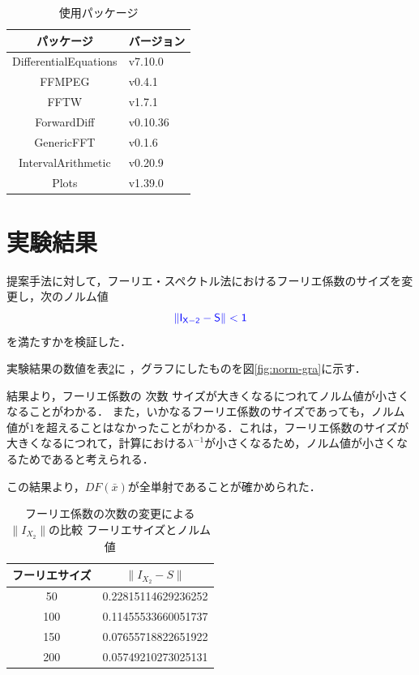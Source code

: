 \documentclass[11pt,a4paper,titlepage]{jsreport}
\theoremstyle{definition}
\providecommand{\DIFadd}[1]{{\protect\color{blue} \sf #1}} %
\providecommand{\DIFdel}[1]{{\protect\color{red} \scriptsize #1}} %
\providecommand{\DIFaddbegin}{} %
\providecommand{\DIFaddend}{} %
\providecommand{\DIFdelbegin}{} %
\providecommand{\DIFdelend}{} %
\providecommand{\DIFaddFL}[1]{\DIFadd{#1}} %
\providecommand{\DIFdelFL}[1]{\DIFdel{#1}} %
\providecommand{\DIFaddbeginFL}{} %
\providecommand{\DIFaddendFL}{} %
\providecommand{\DIFdelbeginFL}{} %
\providecommand{\DIFdelendFL}{} %
\newcommand{\DIFscaledelfig}{0.5}
\newlength{\DIFdelgraphicswidth} %
\newlength{\DIFdelgraphicsheight} %
\newcommand{\DIFaddincludegraphics}[2][]{{\color{blue}\fbox{\DIFOincludegraphics[#1]{#2}}}} %
\newcommand{\DIFdelincludegraphics}[2][]{%
\sbox{\DIFdelgraphicsbox}{\DIFOincludegraphics[#1]{#2}}%
\settoboxwidth{\DIFdelgraphicswidth}{\DIFdelgraphicsbox} %
\settoboxtotalheight{\DIFdelgraphicsheight}{\DIFdelgraphicsbox} %
\scalebox{\DIFscaledelfig}{%
\parbox[b]{\DIFdelgraphicswidth}{\usebox{\DIFdelgraphicsbox}\\[-\baselineskip] \rule{\DIFdelgraphicswidth}{0em}}\llap{\resizebox{\DIFdelgraphicswidth}{\DIFdelgraphicsheight}{%
\setlength{\unitlength}{\DIFdelgraphicswidth}%
\begin{picture}(1,1)%
\thicklines\linethickness{2pt} %
{\color[rgb]{1,0,0}\put(0,0){\framebox(1,1){}}}%
{\color[rgb]{1,0,0}\put(0,0){\line( 1,1){1}}}%
{\color[rgb]{1,0,0}\put(0,1){\line(1,-1){1}}}%
\end{picture}%
}\hspace*{3pt}}} %
} %
\DeclareRobustCommand{\DIFaddbegin}{\DIFOaddbegin \let\includegraphics\DIFaddincludegraphics} %
\DeclareRobustCommand{\DIFaddend}{\DIFOaddend \let\includegraphics\DIFOincludegraphics} %
\DeclareRobustCommand{\DIFdelbegin}{\DIFOdelbegin \let\includegraphics\DIFdelincludegraphics} %
\DeclareRobustCommand{\DIFdelend}{\DIFOaddend \let\includegraphics\DIFOincludegraphics} %
\DeclareRobustCommand{\DIFaddbeginFL}{\DIFOaddbeginFL \let\includegraphics\DIFaddincludegraphics} %
\DeclareRobustCommand{\DIFaddendFL}{\DIFOaddendFL \let\includegraphics\DIFOincludegraphics} %
\DeclareRobustCommand{\DIFdelbeginFL}{\DIFOdelbeginFL \let\includegraphics\DIFdelincludegraphics} %
\DeclareRobustCommand{\DIFdelendFL}{\DIFOaddendFL \let\includegraphics\DIFOincludegraphics} %
\begin{document}
\begin{table}[h]
  \centering
  \caption{使用パッケージ}
  \label{tab:パッケージ}
  \begin{tabular}{c||l}
    パッケージ & バージョン \\  \hline
    DifferentialEquations & v7.10.0 \\
    FFMPEG & v0.4.1 \\
    FFTW & v1.7.1 \\
    ForwardDiff & v0.10.36 \\
    GenericFFT & v0.1.6 \\
    IntervalArithmetic & v0.20.9 \\
    Plots & v1.39.0
  \end{tabular}
\end{table}

\section{実験結果}
\DIFaddbegin \DIFadd{提案手法に対して，フーリエ・スペクトル法におけるフーリエ係数のサイズを変更し，次のノルム値
}\begin{equation}
  \DIFadd{\|I_{X-2}-S\|<1
}\end{equation}
\DIFadd{を満たすかを検証した．
}

\DIFaddend 実験結果の数値を表\ref{tab:norm-num}に\DIFaddbegin \DIFadd{，グラフにしたものを図\ref{fig:norm-gra}に}\DIFaddend 示す．

結果より，フーリエ係数の\DIFdelbegin \DIFdel{次数}\DIFdelend \DIFaddbegin \DIFadd{サイズ}\DIFaddend が大きくなるにつれてノルム値が小さくなることがわかる．
また，いかなるフーリエ係数のサイズであっても，ノルム値が$1$を超えることはなかったことがわかる．これは，フーリエ係数のサイズが大きくなるにつれて，計算における$\lambda^{-1}$が小さくなるため，ノルム値が小さくなるためであると考えられる．

\DIFdelbegin \DIFdel{この結果より，$DF(\bar{x})$が全単射であることが確かめられた．
}%

\DIFdelend \begin{table}[htbp]
  \centering
  \caption{\DIFdelbeginFL \DIFdelFL{フーリエ係数の次数の変更による$\|I_{X_2}\|$の比較}\DIFdelendFL \DIFaddbeginFL \DIFaddFL{フーリエサイズとノルム値}\DIFaddendFL }
  \label{tab:norm-num}
  \begin{tabular}{c||c}
    フーリエサイズ & $\| I_{X_2}-S \|$ \\ \hline
    50 & 0.22815114629236252 \\
    100&0.11455533660051737\\
    150&0.07655718822651922\\
    200&0.05749210273025131
\end{tabular}
\end{table}
\end{document}
